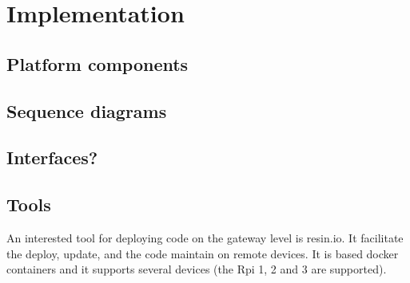 
\section{Implementation}

\subsection{Platform components}
\subsection{Sequence diagrams}
\subsection{Interfaces?}
\subsection{Tools}
An interested tool for deploying code on the gateway level is resin.io.
It facilitate the deploy, update, and the code maintain on remote devices. 
It is based docker containers and it supports several devices (the Rpi 1, 2 and 3 are supported).

